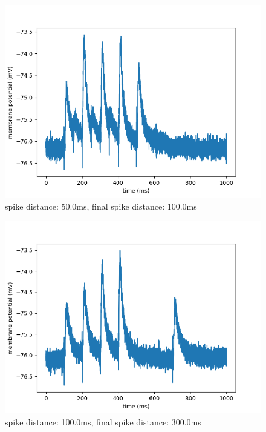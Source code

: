 \documentclass[10pt,a4paper]{scrartcl}
\begin{document}
\begin{figure} [ht]
\begin{center}
\label{fig:abb11}
\caption{spike distance: 50.0ms, final spike distance: 100.0ms}
\includegraphics[scale=0.35]{pictures/final_spike_variation_1.pdf} 
\end{center}
\end{figure}

\newpage

\begin{figure} [ht]
\begin{center}
\label{fig:abb12}
\caption{spike distance: 100.0ms, final spike distance: 300.0ms}
\includegraphics[scale=0.35]{pictures/final_spike_variation_2.pdf} 
\end{center}
\end{figure}
\end{document}
